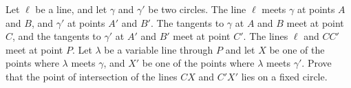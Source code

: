 Let $\ell$ be a line, and let $\gamma$ and $\gamma'$ be two circles. The line $\ell$ meets $\gamma$ at points $A$ and $B$, and $\gamma'$ at points $A'$ and $B'$. The tangents to $\gamma$ at $A$ and $B$ meet at point $C$, and the tangents to $\gamma'$ at $A'$ and $B'$ meet at point $C'$. The lines $\ell$ and $CC'$ meet at point $P$. Let $\lambda$ be a variable line through $P$ and let $X$ be one of the points where $\lambda$ meets $\gamma$, and $X'$ be one of the points where $\lambda$ meets $\gamma'$. Prove that the point of intersection of the lines $CX$ and $C'X'$ lies on a fixed circle.
